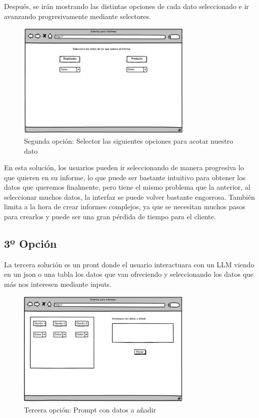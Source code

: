 Después, se irán mostrando las distintas opciones de cada dato seleccionado e ir avanzando progresivamente mediante selectores.

\begin{figure}[hp!]
    \centering
    \includegraphics[width=0.75\textwidth]{imaxes/iteracion1.4.png}
    \caption{Segunda opción: Selector las siguientes opciones para acotar nuestro dato}
    \label{fig:iteracion1.4}
\end{figure}

En esta solución, los usuarios pueden ir seleccionando de manera progresiva lo que quieren en su informe, lo que puede ser bastante intuitivo para obtener los datos que queremos finalmente, pero tiene el mismo problema que la anterior, al seleccionar muchos datos, la interfaz se puede volver bastante engorrosa. También limita a la hora de crear informes complejos, ya que se necesitan muchos pasos para crearlos y puede ser una gran pérdida de tiempo para el cliente.

\subsection{3º Opción}

La tercera solución es un pront donde el usuario interactuara con un LLM viendo en un json o una tabla los datos que van ofreciendo y seleccionando los datos que más nos interesen mediante inputs.

\begin{figure}[hp!]
    \centering
    \includegraphics[width=0.75\textwidth]{imaxes/iteracion1.5.png}
    \caption{Tercera opción: Prompt con datos a añadir}
    \label{fig:iteracion1.5}
\end{figure}

